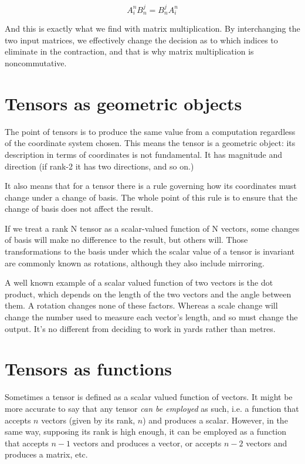 $$A^n_iB^j_n = B^j_nA^n_i$$

And this is exactly what we find with matrix multiplication. By interchanging the two input matrices, we effectively change the decision as to which indices to eliminate in the contraction, and that is why matrix multiplication is noncommutative.

\section{Tensors as geometric objects}

The point of tensors is to produce the same value from a computation regardless of the coordinate system chosen. This means the tensor is a geometric object: its description in terms of coordinates is not fundamental. It has magnitude and direction (if rank-2 it has two directions, and so on.)

It also means that for a tensor there is a rule governing how its coordinates must change under a change of basis. The whole point of this rule is to ensure that the change of basis does not affect the result.

If we treat a rank N tensor as a scalar-valued function of N vectors, some changes of basis will make no difference to the result, but others will. Those transformations to the basis under which the scalar value of a tensor is invariant are commonly known as rotations, although they also include mirroring.

A well known example of a scalar valued function of two vectors is the dot product, which depends on the length of the two vectors and the angle between them. A rotation changes none of these factors. Whereas a scale change will change the number used to measure each vector's length, and so must change the output. It's no different from deciding to work in yards rather than metres.

\section{Tensors as functions}

Sometimes a tensor is defined as a scalar valued function of vectors. It might be more accurate to say that any tensor \textit{can be employed} as such, i.e. a function that accepts $n$ vectors (given by its rank, $n$) and produces a scalar. However, in the same way, supposing its rank is high enough, it can be employed as a function that accepts $n-1$ vectors and produces a vector, or accepts $n-2$ vectors and produces a matrix, etc.

